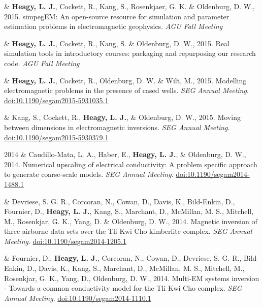 \documentclass[a4paper, 11pt]{article}
\newcommand{\doi}[1]{\href{https://doi.org/#1}{doi:#1}}
\begin{document}
\begin{entryright}
& \textbf{Heagy, L. J.}, Cockett, R., Kang, S., Rosenkjaer, G. K. \& Oldenburg, D. W., 2015. simpegEM: An open-source resource for simulation and parameter estimation problems in electromagnetic geophysics. \emph{AGU Fall Meeting}
\end{entryright}

\begin{entryright}
& \textbf{Heagy, L. J.}, Cockett, R., Kang, S. \& Oldenburg, D. W., 2015. Real simulation tools in introductory courses: packaging and repurposing our research code. \emph{AGU Fall Meeting}
\end{entryright}

\begin{entryright}
& \textbf{Heagy, L. J.}, Cockett, R., Oldenburg, D. W. \& Wilt, M., 2015. Modelling electromagnetic problems in the presence of cased wells. \emph{SEG Annual Meeting}. \doi{10.1190/segam2015-5931035.1}
\end{entryright}

\begin{entryright}
& Kang, S., Cockett, R., \textbf{Heagy, L. J.}, \& Oldenburg, D. W., 2015. Moving between dimensions in electromagnetic inversions. \emph{SEG Annual Meeting}. \doi{10.1190/segam2015-5930379.1}
\end{entryright}

\begin{entryright}
2014 & Caudillo-Mata, L. A., Haber, E., \textbf{Heagy, L. J.}, \& Oldenburg, D. W., 2014. Numerical upscaling of electrical conductivity: A problem specific approach to generate coarse-scale models. \emph{SEG Annual Meeting}. \doi{10.1190/segam2014-1488.1}
\end{entryright}

\begin{entryright}
& Devriese, S. G. R., Corcoran, N., Cowan, D., Davis, K., Bild-Enkin, D., Fournier, D., \textbf{Heagy, L. J.}, Kang, S., Marchant, D., McMillan, M. S., Mitchell, M., Rosenkjar, G. K., Yang, D. \& Oldenburg, D. W., 2014. Magnetic inversion of three airborne data sets over the Tli Kwi Cho kimberlite complex. \emph{SEG Annual Meeting}. \doi{10.1190/segam2014-1205.1}
\end{entryright}

\begin{entryright}
& Fournier, D., \textbf{Heagy, L. J.}, Corcoran, N., Cowan, D., Devriese, S. G. R., Bild-Enkin, D., Davis, K., Kang, S., Marchant, D., McMillan, M. S., Mitchell, M., Rosenkjar, G. K., Yang, D., Oldenburg, D. W., 2014. Multi-EM systems inversion - Towards a common conductivity model for the Tli Kwi Cho complex. \emph{SEG Annual Meeting}. \doi{10.1190/segam2014-1110.1}
\end{entryright}
\end{document}
